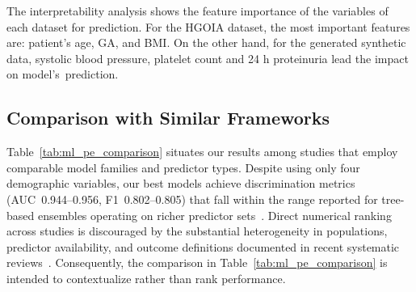 \documentclass[diagnostics,article,accept,pdftex,moreauthors]{Definitions/mdpi}
\begin{document}
  The interpretability analysis shows the feature importance of the
  variables of each dataset for prediction. For the \ac{HGOIA}
  dataset, the most important features are: patient's age, \ac{GA},
  {and} %
  \ac{BMI}. On the other hand, for the generated synthetic data,
  systolic blood pressure, platelet count and 24 h proteinuria lead
  the impact on model's\mbox{ prediction.}

  
\subsection{Comparison with Similar Frameworks}
\label{sec:comp-with-similar-frameworks}

{Table}~\ref{tab:ml_pe_comparison} %
situates our results among studies that employ comparable model
families and predictor types.  Despite using only four demographic
variables, our best models achieve discrimination metrics
(AUC~0.944--0.956, F1~0.802--0.805) that fall within the range
reported for tree-based ensembles operating on richer predictor
sets~\cite{LI2021102,liu_pregnancy_trajectories_2022,zeng_preeclampsia_ml_china_2024,advancing_ml_preeclampsia_2025}.
Direct numerical ranking across studies is discouraged by the
substantial heterogeneity in populations, predictor availability, and
outcome definitions documented in recent systematic
\mbox{reviews~\cite{Darsareh2024,Rahman2023,jmijr_ml_pe_review_2026}.} Consequently,
the comparison in Table~\ref{tab:ml_pe_comparison} is intended to
contextualize rather than rank performance.
\end{document}

